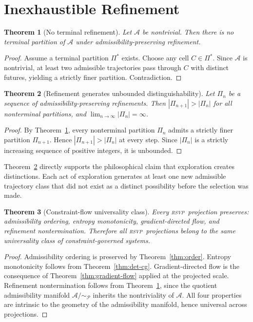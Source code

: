\documentclass[12pt, oneside]{book}
\theoremstyle{plain}
\newtheorem{theorem}{Theorem}[chapter]
\theoremstyle{definition}
\newcommand{\RSVP}{\textsc{rsvp}}
\newcommand{\Adm}{\mathcal{A}}
\begin{document}
\section{Inexhaustible Refinement}
\label{sec:inexhaustible}

\begin{theorem}[No terminal refinement]
\label{thm:no-terminal}
Let $\Adm$ be nontrivial. Then there is no terminal partition of $\Adm$ under
admissibility-preserving refinement.
\end{theorem}

\begin{proof}
Assume a terminal partition $\Pi^*$ exists. Choose any cell $C\in\Pi^*$. Since
$\Adm$ is nontrivial, at least two admissible trajectories pass through $C$ with
distinct futures, yielding a strictly finer partition. Contradiction.
\end{proof}

\begin{theorem}[Refinement generates unbounded distinguishability]
\label{thm:unbounded}
Let $\Pi_n$ be a sequence of admissibility-preserving refinements. Then
$|\Pi_{n+1}| > |\Pi_n|$ for all nonterminal partitions, and
$\lim_{n\to\infty}|\Pi_n| = \infty$.
\end{theorem}

\begin{proof}
By Theorem~\ref{thm:no-terminal}, every nonterminal partition $\Pi_n$ admits a
strictly finer partition $\Pi_{n+1}$. Hence $|\Pi_{n+1}| > |\Pi_n|$ at every step.
Since $|\Pi_n|$ is a strictly increasing sequence of positive integers, it is
unbounded.
\end{proof}

Theorem~\ref{thm:unbounded} directly supports the philosophical claim that exploration
creates distinctions. Each act of exploration generates at least one new admissible
trajectory class that did not exist as a distinct possibility before the selection
was made.

\begin{theorem}[Constraint-flow universality class]
\label{thm:universality-class}
Every \RSVP\ projection preserves: admissibility ordering, entropy monotonicity,
gradient-directed flow, and refinement nontermination. Therefore all \RSVP\
projections belong to the same universality class of constraint-governed systems.
\end{theorem}

\begin{proof}
Admissibility ordering is preserved by Theorem~\ref{thm:order}. Entropy monotonicity
follows from Theorem~\ref{thm:det-cg}. Gradient-directed flow is the consequence of
Theorem~\ref{thm:gradient-flow} applied at the projected scale. Refinement
nontermination follows from Theorem~\ref{thm:no-terminal}, since the quotient
admissibility manifold $\Adm/{\sim_{\mathcal{P}}}$ inherits the nontriviality of
$\Adm$. All four properties are intrinsic to the geometry of the admissibility
manifold, hence universal across projections.
\end{proof}
\end{document}
